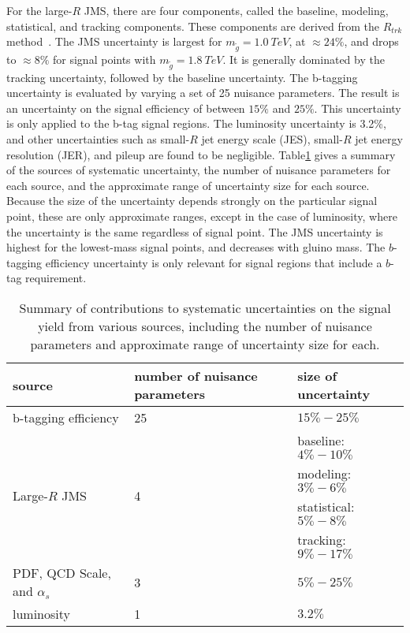 For the large-$R$ JMS, there are four components, called the baseline, modeling, statistical, and tracking components.
These components are derived from the $R_{trk}$ method~\cite{jet-substructure-perf}.
The JMS uncertainty is largest for $m_{\tilde{g}}=1.0~TeV$, at $\approx 24\%$, and drops to $\approx 8\%$ for signal points with $m_{\tilde{g}}=1.8~TeV$.
It is generally dominated by the tracking uncertainty, followed by the baseline uncertainty.
The b-tagging uncertainty is evaluated by varying a set of 25 nuisance parameters.
The result is an uncertainty on the signal efficiency of between $15\%$ and $25\%$.
This uncertainty is only applied to the b-tag signal regions.
The luminosity uncertainty is 3.2\%, and other uncertainties such as small-$R$ jet energy scale (JES), small-$R$ jet energy resolution (JER), and pileup are found to be negligible.
Table\ref{tbl:systematics_summary} gives a summary of the sources of systematic uncertainty, the number of nuisance parameters for each source, and the approximate range of uncertainty size for each source.
Because the size of the uncertainty depends strongly on the particular signal point, these are only approximate ranges, except in the case of luminosity, where the uncertainty is the same regardless of signal point.
The JMS uncertainty is highest for the lowest-mass signal points, and decreases with gluino mass.
The $b$-tagging efficiency uncertainty is only relevant for signal regions that include a $b$-tag requirement.
\begin{table}[!ht]\centering
\begin{tabular}{lll}
    \toprule
    source                              & number of nuisance parameters & size of uncertainty    \\ \midrule
    b-tagging efficiency                & 25                            & $15\%-25\%$            \\ \midrule
    \multirow[t]{4}{*}{Large-$R$ JMS}   & \multirow[t]{4}{*}{4}         & baseline: $4\%-10\%$   \\
                                        &                               & modeling: $3\%-6\%$    \\
                                        &                               & statistical: $5\%-8\%$ \\
                                        &                               & tracking: $9\%-17\%$   \\ \midrule
    PDF, QCD Scale, and $\alpha_{s}$    & 3                             & $5\%-25\%$             \\ \midrule
    luminosity                          & 1                             & $3.2\%$                \\ \bottomrule
\end{tabular}
\caption{Summary of contributions to systematic uncertainties on the signal yield from various sources, including the number of nuisance parameters and approximate range of uncertainty size for each.}
\label{tbl:systematics_summary}
\end{table}


